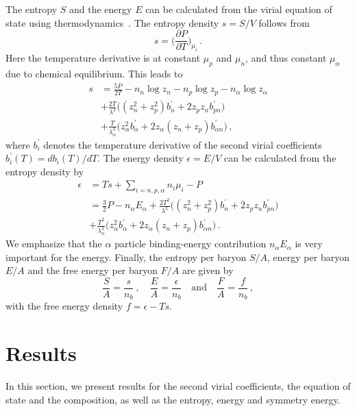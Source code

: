 \documentclass[aps,prc,twocolumn,showpacs,showkeys,amsmath,amssymb]{revtex4}
\begin{document}
The entropy $S$ and the energy $E$ can be calculated from the 
virial equation of state using thermodynamics~\cite{Ho1,huang}. 
The entropy density $s=S/V$ follows from
\begin{equation}
s=\biggl(\frac{\partial P}{\partial T}\biggr)_{\mu_i} \,.
\end{equation}
Here the temperature derivative is at constant $\mu_p$ and $\mu_n$,
and thus constant $\mu_\alpha$ due to chemical equilibrium. This
leads to
\begin{align}
s &= \frac{5P}{2T} - n_n\log z_n - n_p\log z_p - n_\alpha\log z_\alpha
\nonumber \\[1mm]
&+ \frac{2T}{\lambda^3} \bigl((z_n^2+z_p^2) b_n^\prime + 2 z_p z_n 
b_{pn}^\prime \bigr) \nonumber \\[1mm]
&+ \frac{T}{\lambda_\alpha^3} \bigl(z_\alpha^2 b_\alpha^\prime + 2 
z_\alpha (z_n+z_p) b_{\alpha n}^\prime \bigr) \,,
\label{s}
\end{align}
where $b_i^\prime$ denotes the temperature derivative of the second virial 
coefficients $b_i^\prime(T)=db_i(T)/dT$.  The energy density 
$\epsilon=E/V$ can be calculated from the entropy density by
\begin{align}
\epsilon &= Ts+\sum_{i=n,p,\alpha} n_i \mu_i - P \nonumber \\[1mm]
&=\frac{3}{2}P - n_\alpha E_\alpha + \frac{2T^2}{\lambda^3}
\bigl((z_n^2+z_p^2) b_n^\prime + 2 z_p z_n b_{pn}^\prime \bigr)
\nonumber \\[1mm]
&+ \frac{T^2}{\lambda_\alpha^3}\bigl(z_\alpha^2 b_\alpha^\prime 
+ 2 z_\alpha (z_n+z_p) b_{\alpha n}^\prime \bigr) \,.
\label{epsilon}
\end{align}
We emphasize that the $\alpha$ particle binding-energy contribution 
$n_\alpha E_\alpha$ is very important for the energy. Finally, the 
entropy per baryon $S/A$, energy per baryon $E/A$ and the free
energy per baryon $F/A$ are given by
\begin{equation}
\frac{S}{A} = \frac{s}{n_b} \: , \quad
\frac{E}{A} = \frac{\epsilon}{n_b} \quad \text{and} \quad
\frac{F}{A} = \frac{f}{n_b} \,,
\label{ea}
\end{equation}
with the free energy density $f=\epsilon - T s$.

\section{Results}
\label{results}

In this section, we present results for the second virial coefficients, 
the equation of state and the composition, as well as the entropy,
energy and symmetry energy.
\end{document}
